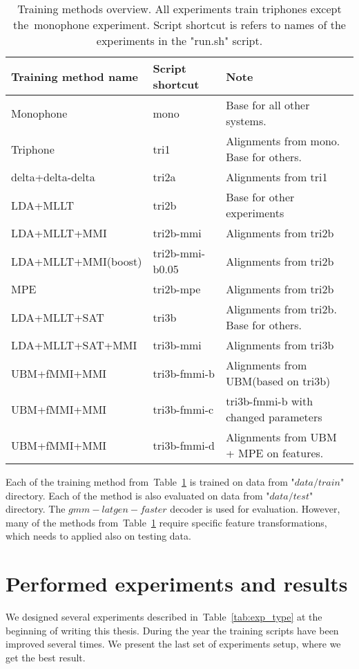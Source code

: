 \begin{table}[!htp]\label{tab:disc_train}
\small{\begin{tabular}{lll}
\hline
Training method name & Script shortcut & Note\\
\hline
Monophone & mono & Base for all other systems.\\
Triphone  & tri1 &  Alignments from mono. Base for others.\\
delta+delta-delta & tri2a & Alignments from tri1 \\
\ac{LDA}+\ac{MLLT} & tri2b &  Base for other experiments \\
\ac{LDA}+\ac{MLLT}+\ac{MMI} & tri2b-mmi & Alignments from tri2b \\
\ac{LDA}+\ac{MLLT}+\ac{MMI}(boost) & tri2b-mmi-b0.05  & Alignments from tri2b \\
\ac{MPE} & tri2b-mpe & Alignments from tri2b \\
\ac{LDA}+\ac{MLLT}+\ac{SAT} & tri3b & Alignments from tri2b. Base for others. \\
\ac{LDA}+\ac{MLLT}+\ac{SAT}+\ac{MMI} & tri3b-mmi  & Alignments from tri3b \\
\ac{UBM}+\ac{fMMI}+\ac{MMI} & tri3b-fmmi-b & Alignments from \ac{UBM}(based on tri3b) \\
\ac{UBM}+\ac{fMMI}+\ac{MMI} & tri3b-fmmi-c & tri3b-fmmi-b with changed parameters \\
\ac{UBM}+\ac{fMMI}+\ac{MMI} & tri3b-fmmi-d & Alignments from \ac{UBM} + \ac{MPE} on features.\\ 
\end{tabular}}
\caption{Training methods overview. All experiments train triphones except the~monophone experiment. Script shortcut is refers to names of the experiments in the "run.sh" script.}
\end{table}

Each of the training method from~Table~\ref{tab:disc_train} is trained on data from "$data/train$" directory.
Each of the method is also evaluated on data from "$data/test$" directory.
The $gmm-latgen-faster$ decoder is used for evaluation. 
However, many of the methods from~Table~\ref{tab:disc_train}
require specific feature transformations, which needs to applied also on testing data.

\section{Performed experiments and results} 
\label{sec:introduction_to_training_acoustic_models}
We designed several experiments described in~Table~\ref{tab:exp_type} at the beginning of writing this thesis.
During the year the training scripts have been improved several times. 
We present the last set of experiments setup, where we get the best result.

